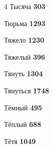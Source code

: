 \begin{multicols}{4}
\noindent Тысяча \dotfill \textbf{\color{secondary} 303}\par
\noindent Тюрьма \dotfill \textbf{\color{secondary} 1293}\par
\noindent Тяжело \dotfill \textbf{\color{secondary} 1230}\par
\noindent Тяжелый \dotfill \textbf{\color{secondary} 396}\par
\noindent Тянуть \dotfill \textbf{\color{secondary} 1304}\par
\noindent Тянуться \dotfill \textbf{\color{secondary} 1748}\par
\noindent Тёмный \dotfill \textbf{\color{secondary} 495}\par
\noindent Тёплый \dotfill \textbf{\color{secondary} 688}\par
\noindent Тётя \dotfill \textbf{\color{secondary} 1049}\par


\end{multicols}
